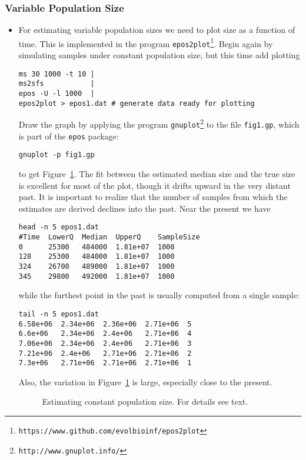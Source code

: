 \documentclass[a4paper, english]{article}
\newcommand{\ty}{\texttt}
\begin{document}
\subsubsection{Variable Population Size}
\begin{itemize}
  \item For estimating variable population sizes we need to
    plot size as a function of time. This is implemented in the
    program \ty{epos2plot}\footnote{\ty{https://www.github.com/evolbioinf/epos2plot}}. Begin again by simulating samples under constant population
    size, but this time add plotting
\begin{verbatim}
ms 30 1000 -t 10 | 
ms2sfs           | 
epos -U -l 1000  | 
epos2plot > epos1.dat # generate data ready for plotting
\end{verbatim}
Draw the graph by applying the program
\ty{gnuplot}\footnote{\ty{http://www.gnuplot.info/}} to the file
\ty{fig1.gp}, which is part of the \ty{epos} package:
\begin{verbatim}
gnuplot -p fig1.gp
\end{verbatim}
to get Figure~\ref{fig:con}. The fit between the estimated median size
and the true size is excellent for most of the plot, though it drifts
upward in the very distant past. It is important to realize that the number of samples
from which the estimates are derived declines into the past. Near the
present we have
\begin{verbatim}
head -n 5 epos1.dat 
#Time  LowerQ  Median  UpperQ    SampleSize
0      25300   484000  1.81e+07  1000
128    25300   484000  1.81e+07	 1000
324    26700   489000  1.81e+07	 1000
345    29800   492000  1.81e+07	 1000
\end{verbatim}        
while the furthest point in the past is usually computed from a single
sample:
\begin{verbatim}
tail -n 5 epos1.dat 
6.58e+06  2.34e+06  2.36e+06  2.71e+06  5
6.6e+06   2.34e+06  2.4e+06   2.71e+06  4
7.06e+06  2.34e+06  2.4e+06   2.71e+06  3
7.21e+06  2.4e+06   2.71e+06  2.71e+06  2
7.3e+06   2.71e+06  2.71e+06  2.71e+06  1
\end{verbatim}
Also, the variation in Figure~\ref{fig:con} is
large, especially close to the present.
\begin{figure}
  \begin{center}
    \scalebox{0.6}{}
  \end{center}
  \caption{Estimating constant population size. For details see
  text.}\label{fig:con}
\end{figure}

\end{itemize}
\end{document}
